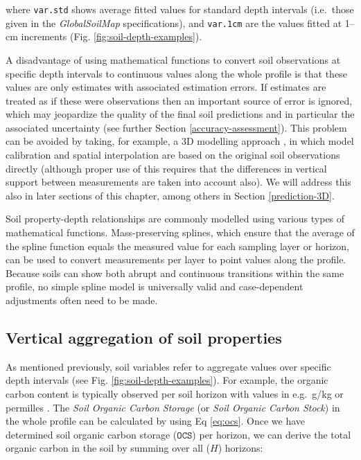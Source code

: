 \documentclass[11pt]{krantz}
\makeatletter
\newenvironment{kframe}{%
\medskip{}
\setlength{\fboxsep}{.8em}
 \def\at@end@of@kframe{}%
 \ifinner\ifhmode%
  \def\at@end@of@kframe{\end{minipage}}%
  \begin{minipage}{\columnwidth}%
 \fi\fi%
 \def\FrameCommand##1{\hskip\@totalleftmargin \hskip-\fboxsep
 \colorbox{shadecolor}{##1}\hskip-\fboxsep
     \hskip-\linewidth \hskip-\@totalleftmargin \hskip\columnwidth}%
 \MakeFramed {\advance\hsize-\width
   \@totalleftmargin\z@ \linewidth\hsize
   \@setminipage}}%
 {\par\unskip\endMakeFramed%
 \at@end@of@kframe}
\newenvironment{rmdblock}[1]
  {
  \begin{itemize}
  \renewcommand{\labelitemi}{
    \raisebox{-.7\height}[0pt][0pt]{
      {\setkeys{Gin}{width=3em,keepaspectratio}\texttt{[image: images/\#1]}}
    }
  }
  \setlength{\fboxsep}{1em}
  \begin{kframe}
  \item
  }
  {
  \end{kframe}
  \end{itemize}
  }
\newenvironment{rmdnote}
  {\begin{rmdblock}{note}}
  {\end{rmdblock}}
\theoremstyle{definition}
\theoremstyle{definition}
\theoremstyle{definition}
\theoremstyle{remark}
\makeatother
\begin{document}
where \texttt{var.std} shows average fitted values for standard depth
intervals (i.e.~those given in the \emph{GlobalSoilMap} specifications),
and \texttt{var.1cm} are the values fitted at 1--cm increments (Fig.
\ref{fig:soil-depth-examples}).

A disadvantage of using mathematical functions to convert soil
observations at specific depth intervals to continuous values along the
whole profile is that these values are only estimates with associated
estimation errors. If estimates are treated as if these were
observations then an important source of error is ignored, which may
jeopardize the quality of the final soil predictions and in particular
the associated uncertainty (see further Section
\ref{accuracy-assessment}). This problem can be avoided by taking, for
example, a 3D modelling approach
\citep{poggio2014national, Hengl2015AfSoilGrids250m}, in which model
calibration and spatial interpolation are based on the original soil
observations directly (although proper use of this requires that the
differences in vertical support between measurements are taken into
account also). We will address this also in later sections of this
chapter, among others in Section \ref{prediction-3D}.

\begin{rmdnote}
Soil property-depth relationships are commonly modelled using various
types of mathematical functions. Mass-preserving splines, which ensure
that the average of the spline function equals the measured value for
each sampling layer or horizon, can be used to convert measurements per
layer to point values along the profile. Because soils can show both
abrupt and continuous transitions within the same profile, no simple
spline model is universally valid and case-dependent adjustments often
need to be made.
\end{rmdnote}

\hypertarget{vertical-aggregation}{%
\subsection{Vertical aggregation of soil
properties}\label{vertical-aggregation}}

As mentioned previously, soil variables refer to aggregate values over
specific depth intervals (see Fig. \ref{fig:soil-depth-examples}). For
example, the organic carbon content is typically observed per soil
horizon with values in e.g.~g/kg or permilles
\citep{Conant2010, Rainer2010, Panagos2013439}. The \emph{Soil Organic
Carbon Storage} (or \emph{Soil Organic Carbon Stock}) in the whole
profile can be calculated by using Eq \eqref{eq:ocs}. Once we have
determined soil organic carbon storage (\(\mathtt{OCS}\)) per horizon,
we can derive the total organic carbon in the soil by summing over all
(\(H\)) horizons:
\end{document}
